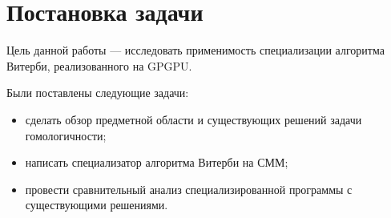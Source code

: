 \section{Постановка задачи}
Цель данной работы --- исследовать применимость специализации алгоритма Витерби, реализованного на GPGPU.

Были поставлены следующие задачи:
\begin{itemize}
	\item сделать обзор предметной области и существующих решений задачи 
		гомологичности;
	\item написать специализатор алгоритма Витерби на СММ;
	\item провести сравнительный анализ специализированной программы с
		существующими решениями.
\end{itemize}

